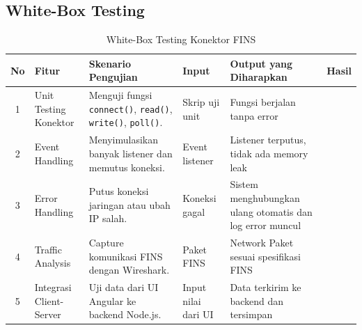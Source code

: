 \subsection{White-Box Testing}
\begin{table}[H]
    \centering
    \begin{tabular}{|c|p{3cm}|p{3.5cm}|p{2cm}|p{3cm}|p{2cm}|}
        \hline
        \textbf{No} & \textbf{Fitur} & \textbf{Skenario Pengujian} & \textbf{Input} & \textbf{Output yang Diharapkan} & \textbf{Hasil} \\
        \hline
        1 & Unit Testing Konektor & Menguji fungsi \texttt{connect()}, \texttt{read()}, \texttt{write()}, \texttt{poll()}. & Skrip uji unit & Fungsi berjalan tanpa error &  \\
        \hline
        2 & Event Handling & Menyimulasikan banyak listener dan memutus koneksi. & Event listener & Listener terputus, tidak ada memory leak &  \\
        \hline
        3 & Error Handling & Putus koneksi jaringan atau ubah IP salah. & Koneksi gagal & Sistem menghubungkan ulang otomatis dan log error muncul &  \\
        \hline
        4 & Traffic Analysis & Capture komunikasi FINS dengan Wireshark. & Paket FINS & Network Paket sesuai spesifikasi FINS &  \\
        \hline
        5 & Integrasi Client-Server & Uji data dari UI Angular ke backend Node.js. & Input nilai dari UI & Data terkirim ke backend dan tersimpan &  \\
        \hline
    \end{tabular}
    \caption{White-Box Testing Konektor FINS}
    \label{tab:whitebox}
\end{table}



